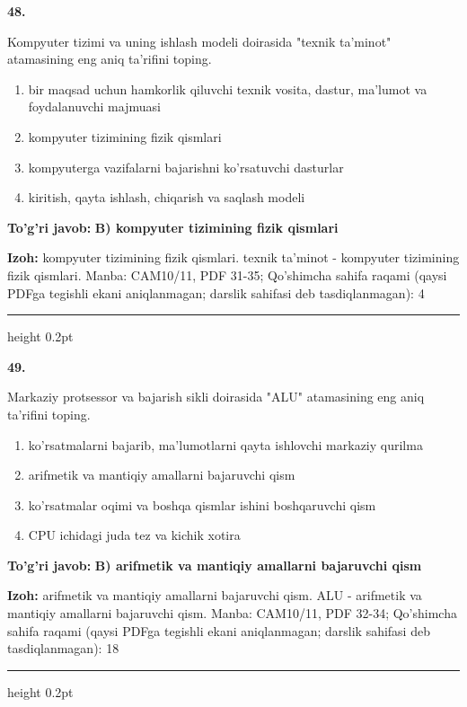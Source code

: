 \documentclass[10pt,a4paper]{article}
\begin{document}
{\bfseries\sffamily\color{ink} 48.}
\par
Kompyuter tizimi va uning ishlash modeli doirasida "texnik ta'minot" atamasining eng aniq ta'rifini toping.
\begin{enumerate}[label=\Alph*),leftmargin=9mm]
\item bir maqsad uchun hamkorlik qiluvchi texnik vosita, dastur, ma'lumot va foydalanuvchi majmuasi
\item kompyuter tizimining fizik qismlari
\item kompyuterga vazifalarni bajarishni ko'rsatuvchi dasturlar
\item kiritish, qayta ishlash, chiqarish va saqlash modeli
\end{enumerate}
\begin{tcolorbox}[enhanced,breakable,colback=teal!4,colframe=teal!60!black,boxrule=0.45pt,arc=1.2mm,left=2.7mm,right=2.7mm,top=1.8mm,bottom=1.8mm,before skip=2mm,after skip=2mm]
{\bfseries\sffamily\color{teal}To'g'ri javob:} \textbf{B) kompyuter tizimining fizik qismlari}
\par\smallskip
{\bfseries Izoh:} kompyuter tizimining fizik qismlari. texnik ta'minot - kompyuter tizimining fizik qismlari. Manba: CAM10/11, PDF 31-35; Qo'shimcha sahifa raqami (qaysi PDFga tegishli ekani aniqlanmagan; darslik sahifasi deb tasdiqlanmagan): 4
\end{tcolorbox}
\vspace{2mm}\hrule height 0.2pt\vspace{3mm}

{\bfseries\sffamily\color{ink} 49.}
\par
Markaziy protsessor va bajarish sikli doirasida "ALU" atamasining eng aniq ta'rifini toping.
\begin{enumerate}[label=\Alph*),leftmargin=9mm]
\item ko'rsatmalarni bajarib, ma'lumotlarni qayta ishlovchi markaziy qurilma
\item arifmetik va mantiqiy amallarni bajaruvchi qism
\item ko'rsatmalar oqimi va boshqa qismlar ishini boshqaruvchi qism
\item CPU ichidagi juda tez va kichik xotira
\end{enumerate}
\begin{tcolorbox}[enhanced,breakable,colback=teal!4,colframe=teal!60!black,boxrule=0.45pt,arc=1.2mm,left=2.7mm,right=2.7mm,top=1.8mm,bottom=1.8mm,before skip=2mm,after skip=2mm]
{\bfseries\sffamily\color{teal}To'g'ri javob:} \textbf{B) arifmetik va mantiqiy amallarni bajaruvchi qism}
\par\smallskip
{\bfseries Izoh:} arifmetik va mantiqiy amallarni bajaruvchi qism. ALU - arifmetik va mantiqiy amallarni bajaruvchi qism. Manba: CAM10/11, PDF 32-34; Qo'shimcha sahifa raqami (qaysi PDFga tegishli ekani aniqlanmagan; darslik sahifasi deb tasdiqlanmagan): 18
\end{tcolorbox}
\vspace{2mm}\hrule height 0.2pt\vspace{3mm}
\end{document}
